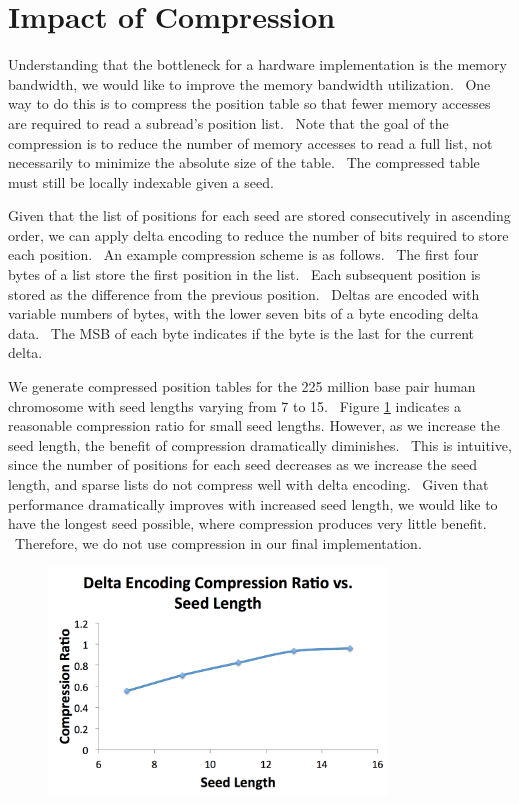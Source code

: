 \documentclass[11pt]{article}
\begin{document}
\section{Impact of Compression}
Understanding that the bottleneck for a hardware implementation is the memory bandwidth, we would like to improve the memory bandwidth utilization.  One way to do this is to compress the position table so that fewer memory accesses are required to read a subread's position list.  Note that the goal of the compression is to reduce the number of memory accesses to read a full list, not necessarily to minimize the absolute size of the table.  The compressed table must still be locally indexable given a seed.

Given that the list of positions for each seed are stored consecutively in ascending order, we can apply delta encoding to reduce the number of bits required to store each position.  An example compression scheme is as follows.  The first four bytes of a list store the first position in the list.  Each subsequent position is stored as the difference from the previous position.  Deltas are encoded with variable numbers of bytes, with the lower seven bits of a byte encoding delta data.  The MSB of each byte indicates if the byte is the last for the current delta.

We generate compressed position tables for the 225 million base pair human chromosome with seed lengths varying from 7 to 15.  Figure \ref{compratio} indicates a reasonable compression ratio for small seed lengths. However, as we increase the seed length, the benefit of compression dramatically diminishes.  This is intuitive, since the number of positions for each seed decreases as we increase the seed length, and sparse lists do not compress well with delta encoding.  Given that performance dramatically improves with increased seed length, we would like to have the longest seed possible, where compression produces very little benefit.  Therefore, we do not use compression in our final implementation.
\begin{figure}[ht!]
\centering
\includegraphics[width=90mm]{compratio.png}
\caption{}
\label{compratio}
\end{figure}
\end{document}
